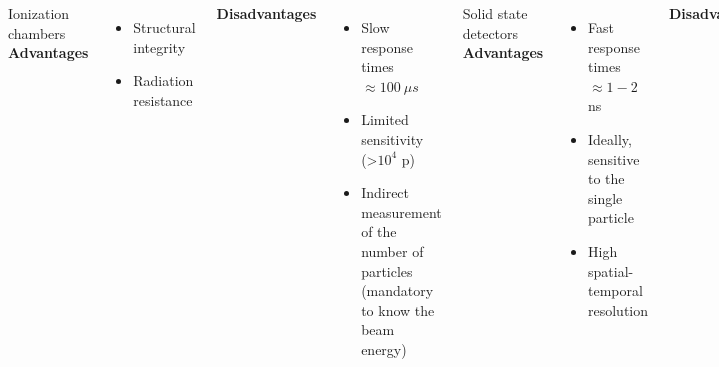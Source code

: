 \documentclass[aspectratio=169]{beamer}
\begin{document}
\begin{frame}
\begin{columns}
\begin{center}
			\end{center}
			{\color{blue} Ionization chambers}
			\newline
			\textbf{Advantages}
			\begin{itemize}
				\item Structural integrity
				\item Radiation resistance
			\end{itemize}
			\textbf{Disadvantages}
			\begin{itemize}
				\item Slow response times $\approx 100\:\mu s$
				\item Limited sensitivity (>$10^4$ p)
				\item Indirect measurement of the number of particles  (mandatory to know the beam energy)
			\end{itemize}
			{\color{blue} Solid state detectors}
			\newline
			\textbf{Advantages}
			\begin{itemize}
				\item Fast response times $\approx 1-2$ ns
				\item Ideally, sensitive to the single particle
				\item High spatial-temporal resolution
			\end{itemize}
			\textbf{Disadvantages}
			\begin{itemize}
				\item Complex and fast readout electronics
				\item Damage from radiation
				\item pile-up effects at high\newline rates
			\end{itemize}
		\end{columns}
	\end{frame}
\end{document}
